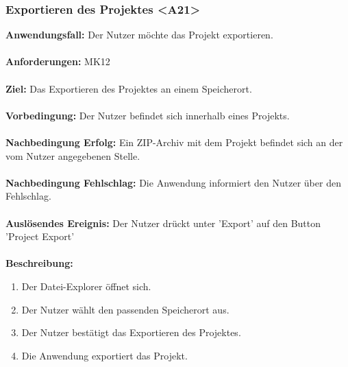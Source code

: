 \documentclass[parskip=full]{scrartcl} %
\begin{document}
\subsubsection*{Exportieren des Projektes <A21>}
\textbf{Anwendungsfall:} Der Nutzer möchte das Projekt exportieren. \\\\
\textbf{Anforderungen:} MK12\\\\
\textbf{Ziel:} Das Exportieren des Projektes an einem Speicherort.\\\\
\textbf{Vorbedingung:} Der Nutzer befindet sich innerhalb eines Projekts.\\\\
\textbf{Nachbedingung Erfolg:} Ein ZIP-Archiv mit dem Projekt befindet sich an der vom Nutzer angegebenen Stelle.\\\\
\textbf{Nachbedingung Fehlschlag:} Die Anwendung informiert den Nutzer über den Fehlschlag.\\\\
\textbf{Auslösendes Ereignis:}  Der Nutzer drückt unter 'Export' auf den Button 'Project Export' \\\\
\textbf{Beschreibung:}
\begin{enumerate}
    \item Der Datei-Explorer öffnet sich.
    \item Der Nutzer wählt den passenden Speicherort aus.
    \item Der Nutzer bestätigt das Exportieren des Projektes.
    \item Die Anwendung exportiert das Projekt.
\end{enumerate}
\newpage
\end{document}
